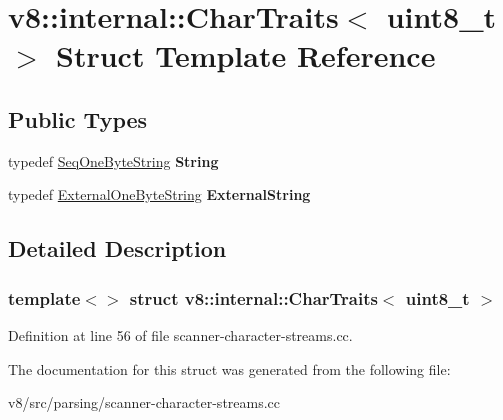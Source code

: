 \hypertarget{structv8_1_1internal_1_1CharTraits_3_01uint8__t_01_4}{}\section{v8\+:\+:internal\+:\+:Char\+Traits$<$ uint8\+\_\+t $>$ Struct Template Reference}
\label{structv8_1_1internal_1_1CharTraits_3_01uint8__t_01_4}
\subsection*{Public Types}
\begin{DoxyCompactItemize}
\item 
\mbox{\label{structv8_1_1internal_1_1CharTraits_3_01uint8__t_01_4_aa8efa7c8eaab118644b8ffb4ea527824}} 
typedef \mbox{\hyperlink{classv8_1_1internal_1_1SeqOneByteString}{Seq\+One\+Byte\+String}} {\bfseries String}
\item 
\mbox{\label{structv8_1_1internal_1_1CharTraits_3_01uint8__t_01_4_ae6bc6c4313f5f1254b95558cd407cfde}} 
typedef \mbox{\hyperlink{classv8_1_1internal_1_1ExternalOneByteString}{External\+One\+Byte\+String}} {\bfseries External\+String}
\end{DoxyCompactItemize}


\subsection{Detailed Description}
\subsubsection*{template$<$$>$\newline
struct v8\+::internal\+::\+Char\+Traits$<$ uint8\+\_\+t $>$}



Definition at line 56 of file scanner-\/character-\/streams.\+cc.



The documentation for this struct was generated from the following file\+:\begin{DoxyCompactItemize}
\item 
v8/src/parsing/scanner-\/character-\/streams.\+cc\end{DoxyCompactItemize}
